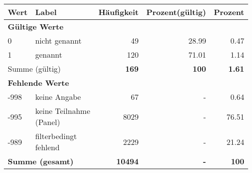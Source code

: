      \begin{longtable}{lXrrr}
     \toprule
     \textbf{Wert} & \textbf{Label} & \textbf{Häufigkeit} & \textbf{Prozent(gültig)} & \textbf{Prozent} \\
     \endhead
     \midrule
     \multicolumn{5}{l}{\textbf{Gültige Werte}}\\

     0 &
     \multicolumn{1}{X}{ nicht genannt   } &


       \num{49} &
       \num[round-mode=places,round-precision=2]{28,99} &
         \num[round-mode=places,round-precision=2]{0,47} \\

     1 &
     \multicolumn{1}{X}{ genannt   } &


       \num{120} &
       \num[round-mode=places,round-precision=2]{71,01} &
         \num[round-mode=places,round-precision=2]{1,14} \\
     \midrule
     \multicolumn{2}{l}{Summe (gültig)} &
       \textbf{\num{169}} &
     \textbf{100} &
       \textbf{\num[round-mode=places,round-precision=2]{1,61}} \\
     \multicolumn{5}{l}{\textbf{Fehlende Werte}}\\
       -998 &
       keine Angabe &
         \num{67} &
        - &
         \num[round-mode=places,round-precision=2]{0,64} \\
       -995 &
       keine Teilnahme (Panel) &
         \num{8029} &
        - &
         \num[round-mode=places,round-precision=2]{76,51} \\
       -989 &
       filterbedingt fehlend &
         \num{2229} &
        - &
         \num[round-mode=places,round-precision=2]{21,24} \\
     \midrule
     \multicolumn{2}{l}{\textbf{Summe (gesamt)}} &
          \textbf{\num{10494}} &
        \textbf{-} &
        \textbf{100} \\
     \bottomrule
     \end{longtable}
     
